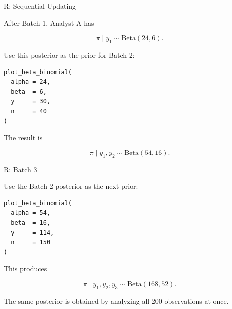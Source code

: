 \documentclass[aspectratio=43]{beamer}
\begin{document}
\begin{frame}[fragile]{R: Sequential Updating}

After Batch 1, Analyst A has

\[
\pi \mid y_1 \sim \mathrm{Beta}(24,6).
\]

Use this posterior as the prior for Batch 2:

\begin{verbatim}
plot_beta_binomial(
  alpha = 24,
  beta  = 6,
  y     = 30,
  n     = 40
)
\end{verbatim}

The result is

\[
\pi \mid y_1,y_2
\sim
\mathrm{Beta}(54,16).
\]

\end{frame}

\begin{frame}[fragile]{R: Batch 3}

Use the Batch 2 posterior as the next prior:

\begin{verbatim}
plot_beta_binomial(
  alpha = 54,
  beta  = 16,
  y     = 114,
  n     = 150
)
\end{verbatim}

This produces

\[
\pi \mid y_1,y_2,y_3
\sim
\mathrm{Beta}(168,52).
\]

The same posterior is obtained by analyzing all 200 observations
at once.

\end{frame}

\end{document}
